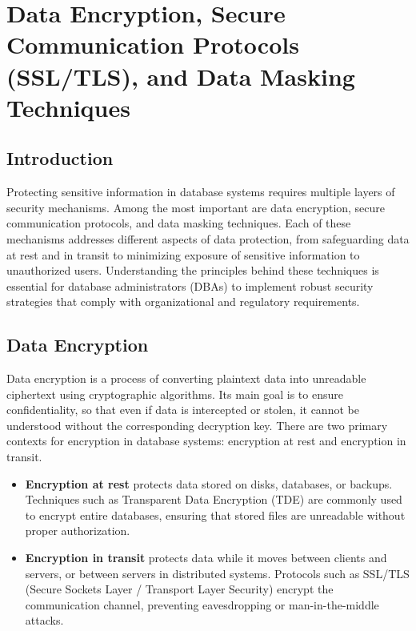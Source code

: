 \documentclass[12pt,a4paper]{article}
\begin{document}
\section{Data Encryption, Secure Communication Protocols (SSL/TLS), and Data Masking Techniques}

\subsection*{Introduction}

Protecting sensitive information in database systems requires multiple layers of security mechanisms. Among the most important are data encryption, secure communication protocols, and data masking techniques. Each of these mechanisms addresses different aspects of data protection, from safeguarding data at rest and in transit to minimizing exposure of sensitive information to unauthorized users. Understanding the principles behind these techniques is essential for database administrators (DBAs) to implement robust security strategies that comply with organizational and regulatory requirements.

\subsection{Data Encryption}

Data encryption is a process of converting plaintext data into unreadable ciphertext using cryptographic algorithms. Its main goal is to ensure confidentiality, so that even if data is intercepted or stolen, it cannot be understood without the corresponding decryption key. There are two primary contexts for encryption in database systems: encryption at rest and encryption in transit.

\begin{itemize}
  \item \textbf{Encryption at rest} protects data stored on disks, databases, or backups. Techniques such as Transparent Data Encryption (TDE) are commonly used to encrypt entire databases, ensuring that stored files are unreadable without proper authorization.
  \item \textbf{Encryption in transit} protects data while it moves between clients and servers, or between servers in distributed systems. Protocols such as SSL/TLS (Secure Sockets Layer / Transport Layer Security) encrypt the communication channel, preventing eavesdropping or man-in-the-middle attacks.
\end{itemize}
\end{document}
